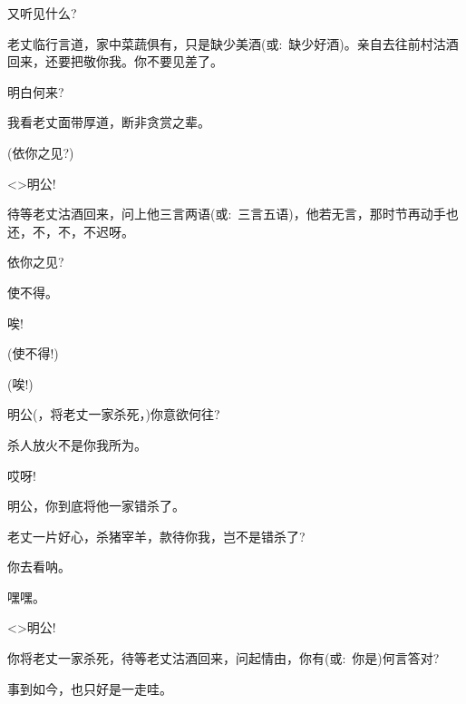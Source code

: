 {又听见什么?

老丈临行言道，家中菜蔬俱有，只是缺少美酒({\akai 或}:~缺少好酒)。亲自去往前村沽酒回来，还要把敬你我。你不要见差了。

明白何来?

我看老丈面带厚道，断非贪赏之辈。

(依你之见?)

\textless{}\!\textgreater{}明公!

待等老丈沽酒回来，问上他三言两语({\akai 或}:~三言五语)，他若无言，那时节再动手也还，不，不，不迟呀。

依你之见?

使不得。

唉!



(使不得!)

(唉!)




明公(，将老丈一家杀死，)你意欲何往?

杀人放火不是你我所为。


哎呀!


明公，你到底将他一家错杀了。

老丈一片好心，杀猪宰羊，款待你我，岂不是错杀了?

你去看呐。

嘿嘿。

\textless{}\!\textgreater{}明公!

你将老丈一家杀死，待等老丈沽酒回来，问起情由，你有({\akai 或}:~你是)何言答对?

事到如今，也只好是一走哇。

}
